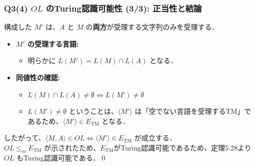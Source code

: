 \begin{frame}[fragile]
\frametitle{Q3(4) $OL$ のTuring認識可能性 (3/3): 正当性と結論}
構成した $M'$ は、$A$ と $M$ の\textbf{両方}が受理する文字列のみを受理する．

\begin{itemize}
  \item \textbf{$M'$ の受理する言語:}
  \begin{itemize}
      \item 明らかに $L(M') = L(M) \cap L(A)$ となる．
  \end{itemize}
  \item \textbf{同値性の確認:}
  \begin{itemize}
      \item $L(M) \cap L(A) \neq \emptyset \iff L(M') \neq \emptyset$
      \item $L(M') \neq \emptyset$ ということは、$\langle M' \rangle$ は「空でない言語を受理するTM」であるため、$\langle M' \rangle \in \overline{E_{\mathrm{TM}}}$ となる．
  \end{itemize}
\end{itemize}

\vspace{0.5em}
したがって、$\langle M, A \rangle \in OL \iff \langle M' \rangle \in \overline{E_{\mathrm{TM}}}$ が成立する．\\
$OL \le_m \overline{E_{\mathrm{TM}}}$ が示されたため、$\overline{E_{\mathrm{TM}}}$がTuring認識可能であるため、定理5.28より$OL$ もTuring認識可能である．\qed
\end{frame}

